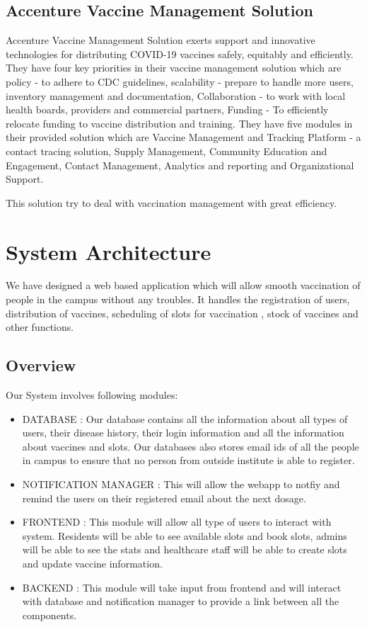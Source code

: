 \documentclass[10pt,twocolumn,letterpaper]{article}
\begin{document}
\subsection{Accenture Vaccine Management Solution}

Accenture Vaccine Management Solution exerts support and innovative technologies for distributing COVID-19 vaccines safely, equitably and efficiently. They have four key priorities in their vaccine management solution which are policy - to adhere to CDC guidelines, scalability - prepare to handle more users, inventory management and documentation, Collaboration - to work with local health boards, providers and commercial partners, Funding - To efficiently relocate funding to vaccine distribution and training.
They have five modules in their provided solution which are Vaccine Management and Tracking Platform - a contact tracing solution, Supply Management, Community Education and Engagement, Contact Management, Analytics and reporting and Organizational Support.~\cite{Alpher07}

This solution try to deal with vaccination management with great efficiency.

\section{System Architecture}

We have designed a web based application which will allow smooth vaccination of people in the campus without any troubles. It handles the registration of users, distribution of vaccines, scheduling of slots for vaccination , stock of vaccines and other functions.
\subsection{Overview}

Our System involves following modules:
\begin{itemize}
    \item DATABASE : Our database contains all the information about all types of users, their disease history, their login information and all the information about vaccines and slots. Our databases also stores email ids of all the people in campus to ensure that no person from outside institute is able to register.
    \item NOTIFICATION MANAGER : This will allow the webapp to notfiy and remind the users on their registered email about the next dosage.
    \item FRONTEND : This module will allow all type of users to interact with system. Residents will be able to see available slots and book slots, admins will be able to see the stats and healthcare staff will be able to create slots and update vaccine information.
    \item BACKEND : This module will take input from frontend and will interact with database and notification manager to provide a link between all the components.
\end{itemize}
\end{document}

